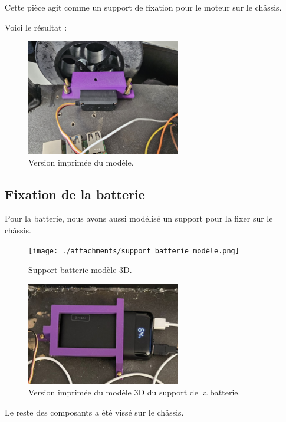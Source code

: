 \documentclass[a4paper,12pt]{report}  %
\begin{document}
Cette pièce agit comme un support de fixation pour le moteur sur le châssis.

Voici le résultat : 

\begin{figure}[H]
	\centering
	\includegraphics[width=0.6\textwidth]{./attachments/servomoteur-roues_impression.jpg}
	\caption{Version imprimée du modèle.}
\end{figure}

\subsection{Fixation de la batterie}
Pour la batterie, nous avons aussi modélisé un support pour la fixer sur le châssis.

\begin{figure}[H]
	\centering
	\texttt{[image: ./attachments/support\_batterie\_modèle.png]}
	\caption{Support batterie modèle 3D.}
\end{figure}

\begin{figure}[H]
	\centering
	\includegraphics[width=0.6\textwidth]{./attachments/support_batterie_impression.png}
	\caption{Version imprimée du modèle 3D du support de la batterie.}
\end{figure}

Le reste des composants a été vissé sur le châssis.

\pagebreak
\end{document}
